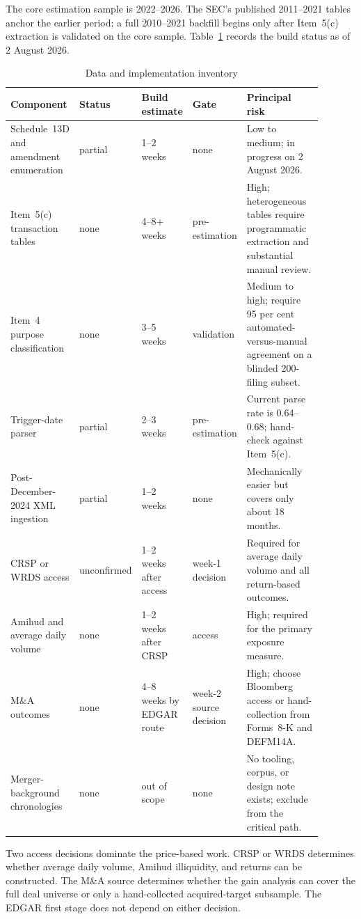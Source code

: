 The core estimation sample is 2022--2026. The SEC's published 2011--2021 tables
anchor the earlier period; a full 2010--2021 backfill begins only after
Item~5(c) extraction is validated on the core sample. Table~\ref{tab:plan-data}
records the build status as of 2 August 2026.

\begin{table}[htbp]
\centering
\scriptsize
\caption{Data and implementation inventory}
\label{tab:plan-data}
\begin{tabular}{@{}p{0.22\linewidth}p{0.10\linewidth}p{0.13\linewidth}p{0.17\linewidth}p{0.27\linewidth}@{}}
\toprule
Component & Status & Build estimate & Gate & Principal risk \\
\midrule
Schedule~13D and amendment enumeration & partial & 1--2 weeks & none &
Low to medium; in progress on 2 August 2026. \\
Item~5(c) transaction tables & none & 4--8+ weeks & pre-estimation &
High; heterogeneous tables require programmatic extraction and substantial
manual review. \\
Item~4 purpose classification & none & 3--5 weeks & validation &
Medium to high; require 95 per cent automated-versus-manual agreement on a
blinded 200-filing subset. \\
Trigger-date parser & partial & 2--3 weeks & pre-estimation &
Current parse rate is 0.64--0.68; hand-check against Item~5(c). \\
Post-December-2024 XML ingestion & partial & 1--2 weeks & none &
Mechanically easier but covers only about 18 months. \\
CRSP or WRDS access & unconfirmed & 1--2 weeks after access & week-1 decision &
Required for average daily volume and all return-based outcomes. \\
Amihud and average daily volume & none & 1--2 weeks after CRSP & access &
High; required for the primary exposure measure. \\
M\&A outcomes & none & 4--8 weeks by EDGAR route & week-2 source decision &
High; choose Bloomberg access or hand-collection from Forms~8-K and DEFM14A. \\
Merger-background chronologies & none & out of scope & none &
No tooling, corpus, or design note exists; exclude from the critical path. \\
\bottomrule
\end{tabular}
\end{table}

Two access decisions dominate the price-based work. CRSP or WRDS determines
whether average daily volume, Amihud illiquidity, and returns can be constructed.
The M\&A source determines whether the gain analysis can cover the full deal
universe or only a hand-collected acquired-target subsample. The EDGAR first
stage does not depend on either decision.

